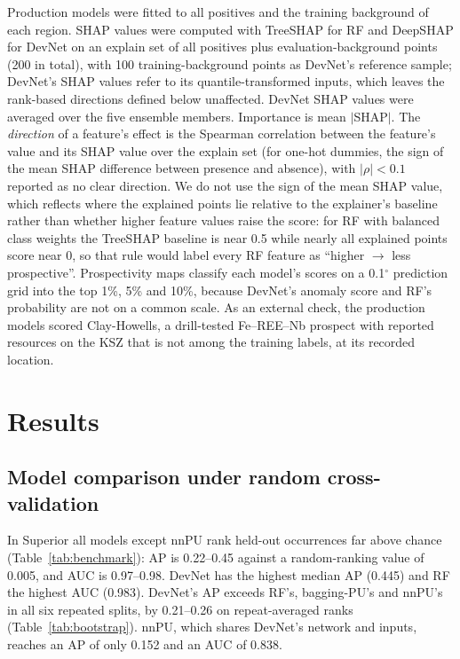 \documentclass[pdflatex,sn-apa]{sn-jnl}
\begin{document}
Production models were fitted to all positives and the training background of each region. SHAP values \citep{Lundberg2017} were computed with TreeSHAP for RF \citep{Lundberg2020} and DeepSHAP for DevNet on an explain set of all positives plus evaluation-background points (200 in total), with 100 training-background points as DevNet's reference sample; DevNet's SHAP values refer to its quantile-transformed inputs, which leaves the rank-based directions defined below unaffected. DevNet SHAP values were averaged over the five ensemble members. Importance is mean $|$SHAP$|$. The \emph{direction} of a feature's effect is the Spearman correlation between the feature's value and its SHAP value over the explain set (for one-hot dummies, the sign of the mean SHAP difference between presence and absence), with $|\rho| < 0.1$ reported as no clear direction. We do not use the sign of the mean SHAP value, which reflects where the explained points lie relative to the explainer's baseline rather than whether higher feature values raise the score: for RF with balanced class weights the TreeSHAP baseline is near 0.5 while nearly all explained points score near 0, so that rule would label every RF feature as ``higher $\rightarrow$ less prospective''. Prospectivity maps classify each model's scores on a 0.1$^\circ$ prediction grid into the top 1\%, 5\% and 10\%, because DevNet's anomaly score and RF's probability are not on a common scale. As an external check, the production models scored Clay-Howells, a drill-tested Fe--REE--Nb prospect with reported resources on the KSZ \citep{OGS2011} that is not among the training labels, at its recorded location.

\section{Results}\label{sec:results}

\subsection{Model comparison under random cross-validation}\label{sec:res-random}

In Superior all models except nnPU rank held-out occurrences far above chance (Table~\ref{tab:benchmark}): AP is 0.22--0.45 against a random-ranking value of 0.005, and AUC is 0.97--0.98. DevNet has the highest median AP (0.445) and RF the highest AUC (0.983). DevNet's AP exceeds RF's, bagging-PU's and nnPU's in all six repeated splits, by 0.21--0.26 on repeat-averaged ranks (Table~\ref{tab:bootstrap}). nnPU, which shares DevNet's network and inputs, reaches an AP of only 0.152 and an AUC of 0.838.
\end{document}
